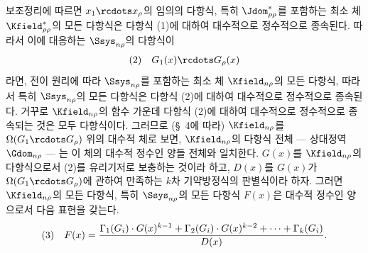 
보조정리에 따르면 $x_1\rcdots x_\rho$의 임의의 다항식, 특히 $\Jdom^*_{\rho\rho}$를 포함하는 최소 체 $\Kfield^*_{\rho\rho}$의 모든 다항식은 다항식 (1)에 대하여 대수적으로 정수적으로 종속된다. 따라서 이에 대응하는 $\Ssys_{n\rho}$의 다항식이
\[
\begin{array}{@{}l@{\quad}c@{}}
(2)& G_1(x)\rcdots G_\rho(x)
\end{array}
\]
라면, 전이 원리에 따라 $\Ssys_{n\rho}$를 포함하는 최소 체 $\Kfield_{n\rho}$의 모든 다항식, 따라서 특히 $\Ssys_{n\rho}$의 모든 다항식은 다항식 (2)에 대하여 대수적으로 정수적으로 종속된다. 거꾸로 $\Kfield_{n\rho}$의 함수 가운데 다항식 (2)에 대하여 대수적으로 정수적으로 종속되는 것은 모두 다항식이다. 그러므로 (\S\ 4에 따라) $\Kfield_{n\rho}$를 $\Omega(G_1\rcdots G_\rho)$ 위의 대수적 체로 보면, $\Kfield_{n\rho}$의 다항식 전체 --- 상대정역 $\Gdom_{n\rho}$ --- 는 이 체의 대수적 정수인 양들 전체와 일치한다. $G(x)$를 $\Kfield_{n\rho}$의 다항식으로서 (2)를 유리기저로 보충하는 것이라 하고, $D(x)$를 $G(x)$가 $\Omega(G_1\rcdots G_\rho)$에 관하여 만족하는 $k$차 기약방정식의 판별식이라 하자. 그러면 $\Kfield_{n\rho}$의 모든 다항식, 특히 $\Ssys_{n\rho}$의 모든 다항식 $F(x)$은 대수적 정수인 양으로서 다음 표현을 갖는다.
\[
\begin{array}{@{}l@{\quad}c@{}}
(3)& \displaystyle F(x)=\frac{\Gamma_1(G_i)\cdot G(x)^{k-1}+\Gamma_2(G_i)\cdot G(x)^{k-2}+\cdots+\Gamma_k(G_i)}{D(x)}.
\end{array}
\]
